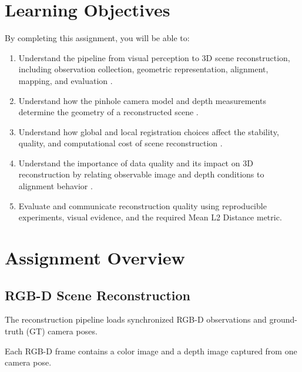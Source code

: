 \documentclass[11pt]{article}
\begin{document}
\section{Learning Objectives}
By completing this assignment, you will be able to:
\begin{enumerate}
\item Understand the pipeline from visual perception to 3D scene reconstruction, including observation collection, geometric representation, alignment, mapping, and evaluation \cite{szeliski2022computer,replica2019}.
\item Understand how the pinhole camera model and depth measurements determine the geometry of a reconstructed scene \cite{hartley2004multiple}.
\item Understand how global and local registration choices affect the stability, quality, and computational cost of scene reconstruction \cite{fischler1981ransac,chen1992object,open3dglobal}.
\item Understand the importance of data quality and its impact on 3D reconstruction by relating observable image and depth conditions to alignment behavior \cite{shin2019camera,immerkaer1996fast}.
\item Evaluate and communicate reconstruction quality using reproducible experiments, visual evidence, and the required Mean L2 Distance metric.
\end{enumerate}

\section{Assignment Overview}
\subsection{RGB-D Scene Reconstruction}
The reconstruction pipeline loads synchronized RGB-D observations and ground-truth (GT) camera poses.

Each RGB-D frame contains a color image and a depth image captured from one camera pose.
\end{document}
